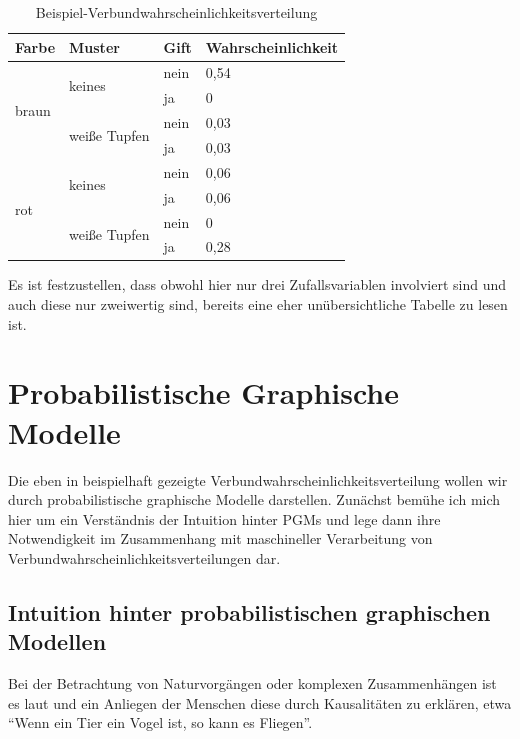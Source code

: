 \documentclass{llncs}
\begin{document}
\begin{table}[htb]
\caption{\label{tab:bspverbwhrv}Beispiel-Verbundwahrscheinlichkeitsverteilung}
\centering
\begin{tabular}{l|l|l|l}
  Farbe & Muster & Gift & Wahrscheinlichkeit \\ \hline
  \multirow{4}{*}{braun} & \multirow{2}{*}{keines}       & nein & 0,54 \\
                         &                               & ja   & 0    \\
                         & \multirow{2}{*}{weiße Tupfen} & nein & 0,03 \\
                         &                               & ja   & 0,03 \\ \hline
  \multirow{4}{*}{rot}   & \multirow{2}{*}{keines}       & nein & 0,06 \\
                         &                               & ja   & 0,06 \\
                         & \multirow{2}{*}{weiße Tupfen} & nein & 0    \\
                         &                               & ja   & 0,28 \\
\end{tabular}
\end{table}

Es ist festzustellen, dass obwohl hier nur drei Zufallsvariablen involviert sind und auch diese nur zweiwertig sind, bereits eine eher unübersichtliche Tabelle zu lesen ist. 

\section{Probabilistische Graphische Modelle}

Die eben in  beispielhaft gezeigte Verbundwahrscheinlichkeitsverteilung wollen wir durch probabilistische graphische Modelle darstellen. Zunächst bemühe ich mich hier um ein Verständnis der Intuition hinter PGMs und lege dann ihre Notwendigkeit im Zusammenhang mit maschineller Verarbeitung von Verbundwahrscheinlichkeitsverteilungen dar. 

\subsection{Intuition hinter probabilistischen graphischen Modellen}

Bei der Betrachtung von Naturvorgängen oder komplexen Zusammenhängen ist es laut \cite{pearl1988probabilistic} und \cite{jensen2001bayesian} ein Anliegen der Menschen diese durch Kausalitäten zu erklären, etwa "`Wenn ein Tier ein Vogel ist, so kann es Fliegen"'. 
\end{document}
